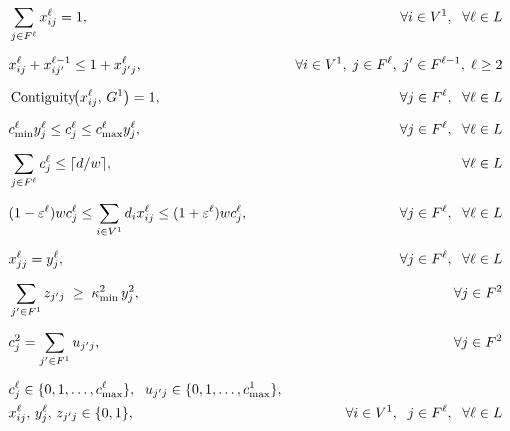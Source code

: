 \documentclass[11pt]{article}
\theoremstyle{definition}
\DeclareMathOperator{\Contiguity}{Contiguity}  %
\begin{document}

\setcounter{equation}{0}
{\allowdisplaybreaks %
\begin{align}
    &\sum\limits_{j \in F^\ell} x_{ij}^\ell=1,
    &\forall i \in V^1, \;\ \forall \ell \in L \label{cons:assignment} \\[6pt]
    & x_{ij}^{\ell} + x_{ij'}^{\ell-1} \leq 1 + x_{j'j}^{\ell},
    &\forall i \in V^1,\; j \in F^\ell,\; j' \in F^{\ell-1},\;
    \ell \ge 2 \label{cons:hierarchy} \\[6pt]
    & \Contiguity\!\bigl(x^{\ell}_{ij},\, G^1\bigr) = 1,
    &\forall j \in F^\ell, \;\ \forall \ell \in L  \label{cons:contiguity} \\[6pt]
    & c^{\ell}_{\min} y^{\ell}_j \leq c^{\ell}_j \leq c^{\ell}_{\max} y^{\ell}_j,
    &\forall j \in F^\ell, \;\ \forall \ell \in L \label{cons4} \\[6pt]
    & \sum\limits_{j \in F^\ell} c^{\ell}_j  \leq  \lceil d/w \rceil,
    &\forall \ell \in L \label{cons:coverage} \\[6pt]
    &(1-\varepsilon^\ell) w c^\ell_j \leq \sum\limits_{i \in V^1} d_i x_{ij}^\ell \leq (1+ \varepsilon^\ell) w c^\ell_j,
    &\forall j \in F^\ell, \;\ \forall \ell \in L \label{cons:balance} \\[6pt]
    &  x^{\ell}_{jj} = y^{\ell}_j,
    &\forall j \in F^\ell, \;\ \forall \ell \in L \label{cons:anchor} \\[6pt]
    & \sum_{j' \in F^1} z_{j'j} \;\geq\; \kappa^2_{\min}\,y^{2}_j,
    &\forall j \in F^2 \label{cons:minL1perL2} \\[6pt]
    & c^{2}_j = \sum\limits_{j' \in F^1} u_{j'j},
    &\forall j \in F^2 \label{cons:aggregate} \\[6pt]
    & c^\ell_j \in \{0, 1, \ldots, c^\ell_{\max}\}, \;\ u_{j'j} \in \{0, 1, \ldots, c^1_{\max}\},
    & \notag \\
    & x^\ell_{ij},\, y^\ell_j,\, z_{j'j} \in \{0, 1\},
    &\forall i \in V^1, \;\ j \in F^\ell, \;\ \forall \ell \in L \label{cons:integrality} 
    \end{align}
}
\end{document}
